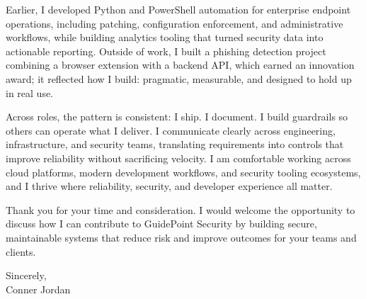 \documentclass[letterpaper,11pt]{article}
\begin{document}
\vspace{16pt}

Earlier, I developed Python and PowerShell automation for enterprise endpoint operations, including patching, configuration enforcement, and administrative workflows, while building analytics tooling that turned security data into actionable reporting. Outside of work, I built a phishing detection project combining a browser extension with a backend API, which earned an innovation award; it reflected how I build: pragmatic, measurable, and designed to hold up in real use.

\vspace{16pt}

Across roles, the pattern is consistent: I ship. I document. I build guardrails so others can operate what I deliver. I communicate clearly across engineering, infrastructure, and security teams, translating requirements into controls that improve reliability without sacrificing velocity. I am comfortable working across cloud platforms, modern development workflows, and security tooling ecosystems, and I thrive where reliability, security, and developer experience all matter.

\vspace{16pt}

Thank you for your time and consideration. I would welcome the opportunity to discuss how I can contribute to GuidePoint Security by building secure, maintainable systems that reduce risk and improve outcomes for your teams and clients.

\vspace{16pt}

Sincerely,\\
Conner Jordan
\end{document}
